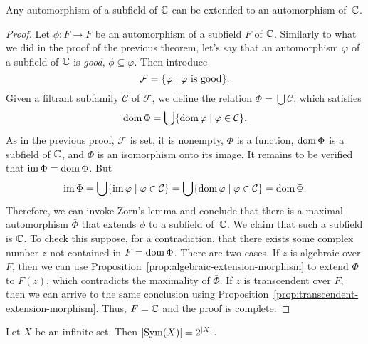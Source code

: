 \begin{thm}
    Any automorphism of a subfield of\/ $\mathbb{C}$ can be extended to an automorphism of\/~$\mathbb{C}$.
\end{thm}

\begin{proof}
    Let $\phi\colon F\to F$ be an automorphism of a subfield $F$ of $\mathbb{C}$. Similarly to what we did in the proof of the previous theorem, let's say that an automorphism $\varphi$ of a subfield of $\mathbb{C}$ is \textsl{good}, $\phi\subseteq\varphi$. Then introduce
    $$
        \mathcal F = \{\varphi\mid\varphi \text{ is good}\}.
    $$
    Given a filtrant subfamily $\mathcal C$ of $\mathcal F$, we define the relation $\Phi=\bigcup\mathcal C$, which satisfies
    $$
        \operatorname{dom}\Phi = \bigcup\{\operatorname{dom}\varphi\mid\varphi\in\mathcal C\}.
    $$
    As in the previous proof, $\mathcal F$ is set, it is nonempty, $\Phi$ is a function, $\operatorname{dom}\Phi$ is a subfield of $\mathbb{C}$, and $\Phi$ is an isomorphism onto its image. It remains to be verified that $\operatorname{im}\Phi=\operatorname{dom}\Phi$. But
    $$
        \operatorname{im}\Phi =\bigcup\{\operatorname{im}\varphi\mid\varphi\in\mathcal C\}
            = \bigcup\{\operatorname{dom}\varphi\mid\varphi\in\mathcal C\}
            = \operatorname{dom}\Phi.
    $$
    Therefore, we can invoke Zorn's lemma and conclude that there is a maximal automorphism $\bar\Phi$ that extends $\phi$ to a subfield of~$\mathbb{C}$. We claim that such a subfield is $\mathbb{C}$. To check this suppose, for a contradiction, that there exists some complex number $z$ not contained in $F=\operatorname{dom}\Phi$. There are two cases. If $z$ is algebraic over $F$, then we can use Proposition~\ref{prop:algebraic-extension-morphism} to extend $\Phi$ to $F(z)$, which contradicts the maximality of $\bar\Phi$. If $z$ is transcendent over $F$, then we can arrive to the same conclusion using Proposition~\ref{prop:transcendent-extension-morphism}. Thus, $F=\mathbb{C}$ and the proof is complete.
    
\end{proof}

\begin{lem}
    Let $X$ be an infinite set. Then $|{\rm Sym}(X)|=2^{|X|}$.
\end{lem}

